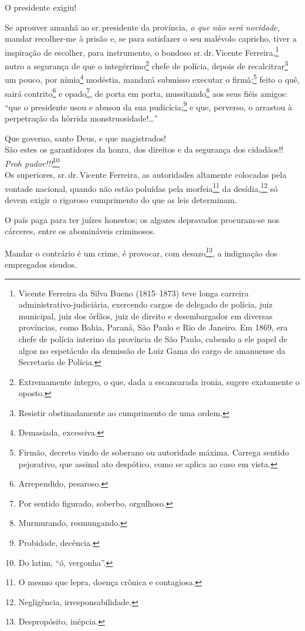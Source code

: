 O presidente exigiu!

Se aprouver amanhã ao sr.\,presidente da província, \emph{o que não será
novidade}, mandar recolher-me à prisão e, se para satisfazer o seu
malévolo capricho, tiver a inspiração de escolher, para instrumento, o
bondoso sr.\,dr.\,Vicente Ferreira,\footnote{Vicente Ferreira da Silva
  Bueno (1815--1873) teve longa carreira administrativo-judiciária,
  exercendo cargos de delegado de polícia, juiz municipal, juiz dos
  órfãos, juiz de direito e desembargador em diversas províncias, como
  Bahia, Paraná, São Paulo e Rio de Janeiro. Em 1869, era chefe de
  polícia interino da província de São Paulo, cabendo a ele papel de
  algoz no espetáculo da demissão de Luiz Gama do cargo de amanuense da
  Secretaria de Polícia.} nutro a segurança de que o
integérrimo\footnote{Extremamente íntegro, o que, dada a escancarada
  ironia, sugere exatamente o oposto.} chefe de polícia, depois de
recalcitrar\footnote{Resistir obstinadamente ao cumprimento de uma
  ordem.} um pouco, por nímia\footnote{Demasiada, excessiva.}
modéstia, mandará submisso executar o firmã;\footnote{Firmão, decreto
  vindo de soberano ou autoridade máxima. Carrega sentido pejorativo,
  que assinal ato despótico, como se aplica ao caso em vista.} feito o
quê, sairá contrito\footnote{Arrependido, pesaroso.} e
opado\footnote{Por sentido figurado, soberbo, orgulhoso.}, de porta em
porta, mussitando\footnote{Murmurando, resmungando.} aos seus fiéis
amigos: ``que o presidente usou e abusou da sua pudicícia;\footnote{
  Probidade, decência.} e que, perverso, o arrastou à perpetração da
hórrida monstruosidade!\ldots{}''

Que governo, santo Deus, e que magistrados!\\
São estes os garantidores da honra, dos direitos e da segurança dos
cidadãos!!\\
\emph{Proh pudor}\emph{!!!}\footnote{Do latim, ``ó, vergonha''.}\\
Os superiores, sr.\,dr.\,Vicente Ferreira, as autoridades altamente
colocadas pela vontade nacional, quando não estão poluídas pela
morfeia\footnote{O mesmo que lepra, doença crônica e contagiosa.} da
desídia,\footnote{Negligência, irresponsabilidade.} só devem exigir o
rigoroso cumprimento do que as leis determinam.

O país paga para ter juízes honestos; os algozes depravados procuram-se
nos cárceres, entre os abomináveis criminosos.

Mandar o contrário é um crime, é provocar, com desazo\footnote{
  Despropósito, inépcia.}, a indignação dos empregados sisudos.

